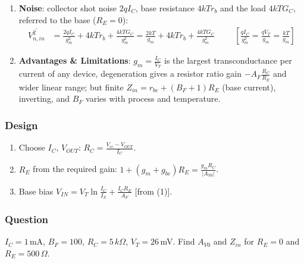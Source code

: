 \begin{enumerate}
    \(HD_2 < 1\%\) needs \(V_p < 0.04\,V_T \approx 1\,\)mV; degeneration divides \(V_{be}\) by \(1 + (g_m + g_{be})R_E\) (Linearity, above).
  \item \textbf{Noise}: collector shot noise \(2qI_C\), base resistance \(4kTr_b\) and the load \(4kTG_C\), referred to
    the base (\(R_E = 0\)):
    \begin{align*}
      \overline{V_{n,in}^2} &= \frac{2qI_C}{g_m^2} + 4kTr_b + \frac{4kTG_C}{g_m^2} = \frac{2kT}{g_m} + 4kTr_b + \frac{4kTG_C}{g_m^2} \hspace{1cm} \left[\frac{qI_C}{g_m^2} = \frac{qV_T}{g_m} = \frac{kT}{g_m}\right]
    \end{align*}
  \item \textbf{Advantages \& Limitations}: \(g_m = \frac{I_C}{V_T}\) is the largest
    transconductance per current of any device, degeneration gives a resistor ratio gain
    \(-A_F\frac{R_C}{R_E}\) and wider linear range; but finite \(Z_{in} = r_{be} + (B_F + 1)R_E\)
    (base current), inverting, and \(B_F\) varies with process and temperature.
\end{enumerate}

\subsubsection{Design}
\begin{enumerate}
  \item Choose \(I_C\), \(V_{OUT}\): \(R_C = \frac{V_{cc} - V_{OUT}}{I_C}\).
  \item \(R_E\) from the required gain: \(1 + (g_m + g_{be}) R_E = \frac{g_m R_C}{|A_{V0}|}\).
  \item Base bias \(V_{IN} = V_T\ln\frac{I_C}{I_S} + \frac{I_C R_E}{A_F}\) [from (1)].
\end{enumerate}

\subsubsection{Question}
\(I_C = 1\,\)mA, \(B_F = 100\), \(R_C = 5\,k\Omega\), \(V_T = 26\,\)mV.
Find \(A_{V0}\) and \(Z_{in}\) for \(R_E = 0\) and \(R_E = 500\,\Omega\).

